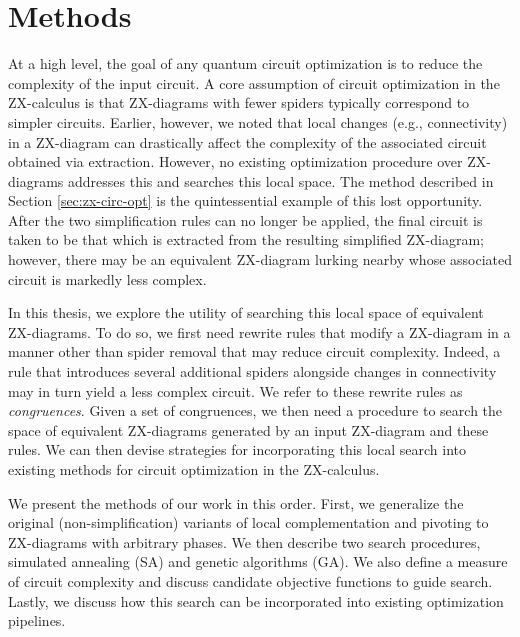 \chapter[Methods]{Methods} \label{ch:methods}

At a high level, the goal of any quantum circuit optimization is to reduce the complexity of the input circuit.
A core assumption of circuit optimization in the ZX-calculus is that ZX-diagrams with fewer spiders typically correspond to simpler circuits.
Earlier, however, we noted that local changes (e.g., connectivity) in a ZX-diagram can drastically affect the complexity of the associated circuit obtained via extraction.
However, no existing optimization procedure over ZX-diagrams addresses this and searches this local space.
The  method described in Section \ref{sec:zx-circ-opt} is the quintessential example of this lost opportunity.
After the two simplification rules can no longer be applied, the final circuit is taken to be that which is extracted from the resulting simplified ZX-diagram;
however, there may be an equivalent ZX-diagram lurking nearby whose associated circuit is markedly less complex.

In this thesis, we explore the utility of searching this local space of equivalent ZX-diagrams.
To do so, we first need rewrite rules that modify a ZX-diagram in a manner other than spider removal that may reduce circuit complexity.
Indeed, a rule that introduces several additional spiders alongside changes in connectivity may in turn yield a less complex circuit.
We refer to these rewrite rules as \emph{congruences}.
Given a set of congruences, we then need a procedure to search the space of equivalent ZX-diagrams generated by an input ZX-diagram and these rules.
We can then devise strategies for incorporating this local search into existing methods for circuit optimization in the ZX-calculus.

We present the methods of our work in this order.
First, we generalize the original (non-simplification) variants of local complementation and pivoting to ZX-diagrams with arbitrary phases.
We then describe two search procedures, simulated annealing (SA) and genetic algorithms (GA).
We also define a measure of circuit complexity and discuss candidate objective functions to guide search. %
Lastly, we discuss how this search can be incorporated into existing optimization pipelines.

